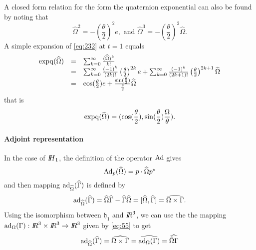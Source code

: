 A closed form relation for the form the quaternion exponential can also be found by noting that
\begin{equation}
  \label{eq:140}
  \widehat \Omega ^2  = - \left(\frac \theta 2 \right)^2 e, \text{ and } \widehat \Omega ^3  = - \left(\frac \theta 2 \right)^2 \widehat \Omega.
\end{equation}
A simple expansion of \eqref{eq:232} at $t=1$ equals
\begin{equation}
  \label{eq:141}
  \begin{array}{lcl}
    \operatorname{expq}(\widehat \Omega ) &=& \sum_{k=0}^\infty \frac{(\widehat \Omega)^k}{k!}\\
                            &=& \sum_{k=0}^\infty \frac{(-1)^k}{(2k)!}\left(\frac \theta 2 \right)^{2k} e + \sum_{k=0}^\infty \frac{(-1)^k}{(2k+1)!} \left(\frac \theta 2 \right)^{2k+1} \widehat \Omega \\
                            &=& \cos(\frac \theta 2) e + \frac{\sin(\frac \theta 2)}{\frac \theta 2} \widehat \Omega \\
  \end{array}
\end{equation}
that is
\begin{equation}
  \label{eq:144}
  \operatorname{expq}(\widehat \Omega )  = (\cos(\frac \theta 2), \sin(\frac \theta 2) \frac{\Omega}{\theta}   ).
\end{equation}

\paragraph{Adjoint representation}
In the case of $\mbox{\rm $I\!\!H$}_1$, the definition of the operator $\operatorname{Ad}$ gives
\begin{equation}
  \label{eq:121}
  \operatorname{Ad}_p(\widehat\Omega)  = p\cdot \widehat\Omega p^\star
\end{equation}
 and then mapping $\operatorname{ad}_{\widehat\Omega}(\widehat \Gamma)$ is defined by
\begin{equation}
  \label{eq:56}
  \operatorname{ad}_{\widehat\Omega}(\widehat\Gamma) = \widehat \Omega \widehat\Gamma - \widehat \Gamma \widehat\Omega  =  [\widehat \Omega,\widehat \Gamma] = \widehat{\Omega \times \Gamma}.
\end{equation}
Using the isomorphism between $\mathfrak h_1$ and $\mbox{\rm $I\!\!R$}^3$, we can use the  the mapping $\operatorname{ad}_{\Omega}(\Gamma) : \mbox{\rm $I\!\!R$}^3\times\mbox{\rm $I\!\!R$}^3 \rightarrow \mbox{\rm $I\!\!R$}^3$ given by \eqref{eq:55} to get 
\begin{equation}
  \label{eq:145}
   \operatorname{ad}_{\widehat\Omega}(\widehat\Gamma) = \widehat{\Omega \times \Gamma} = \widehat{\operatorname{ad}_{\Omega}(\Gamma)} =  \widehat{\tilde \Omega \Gamma}
\end{equation}

